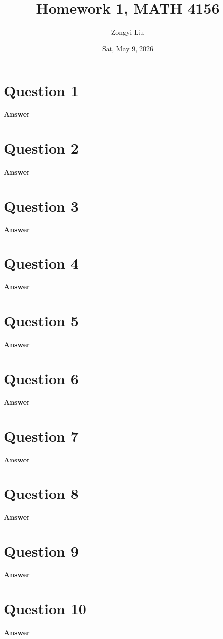 \documentclass[letterpaper]{article}
\title{Homework 1, MATH 4156}
\author{Zongyi Liu}
\date{Sat, May 9, 2026}
\begin{document}
		\maketitle
		\section{Question 1}
		
		\textbf{Answer}
		
		\clearpage
		
		\section{Question 2}
		
		\textbf{Answer}
		
		\clearpage
		
		\section{Question 3}
		
		\textbf{Answer}
		
		\clearpage
		
		\section{Question 4}
		
		\textbf{Answer}
		
		\clearpage
		
		\section{Question 5}
		
		\textbf{Answer}
		
		\clearpage
		
		\section{Question 6}
		
		\textbf{Answer}
		
		\clearpage
		
		\section{Question 7}
		
		\textbf{Answer}
		
		\clearpage
		
		\section{Question 8}
		
		\textbf{Answer}
		
		\clearpage
		
		\section{Question 9}
		
		\textbf{Answer}
		
		\clearpage
		
		\section{Question 10}
		
		\textbf{Answer}
		
		\clearpage
		
		
	
\end{document}

